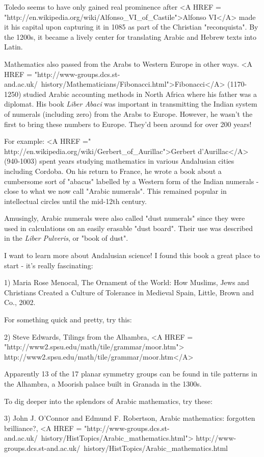 Toledo seems to have only gained real prominence after 
<A HREF = "http://en.wikipedia.org/wiki/Alfonso_VI_of_Castile">Alfonso VI</A> 
made it his capital upon capturing it in 1085 as part of the 
Christian "reconquista".  By the 1200s, it became a lively center 
for translating Arabic and Hebrew texts into Latin.   
  
Mathematics also passed from the Arabs to Western Europe in other
ways.  <A HREF = "http://www-groups.dcs.st-and.ac.uk/~history/Mathematicians/Fibonacci.html">Fibonacci</A> (1170-1250) studied Arabic accounting methods in 
North Africa where his father was a diplomat.  His book \emph{Liber Abaci}
was important in transmitting the Indian system of numerals 
(including zero) from the Arabs to Europe.  However, he wasn't the 
first to bring these numbers to Europe.  They'd been around for over 
200 years!

For example: 
<A HREF =" http://en.wikipedia.org/wiki/Gerbert_of_Aurillac">Gerbert 
d'Aurillac</A> (940-1003) spent years studying
mathematics in various Andalusian cities including Cordoba.  On
his return to France, he wrote a book about a cumbersome sort of 
"abacus" labelled by a Western form of the Indian numerals -
close to what we now call "Arabic numerals".  This 
remained popular in intellectual circles until the mid-12th century.

Amusingly, Arabic numerals were also called "dust numerals" since 
they were used in calculations on an easily erasable "dust board".
Their use was described in the \emph{Liber Pulveris}, 
or "book of dust".

I want to learn more about Andalusian science!  I found this book 
a great place to start - it's really fascinating:

1) Maria Rose Menocal, The Ornament of the World: How Muslims, Jews
and Christians Created a Culture of Tolerance in Medieval Spain,
Little, Brown and Co., 2002.

For something quick and pretty, try this:

2) Steve Edwards, Tilings from the Alhambra, 
<A HREF = "http://www2.spsu.edu/math/tile/grammar/moor.htm">
http://www2.spsu.edu/math/tile/grammar/moor.htm</A>

Apparently 13 of the 17 planar symmetry groups can be found in tile
patterns in the Alhambra, a Moorish palace built in Granada in the
1300s.

To dig deeper into the splendors of Arabic mathematics, try these:

3) John J. O'Connor and Edmund F. Robertson, Arabic mathematics: 
forgotten brilliance?, 
<A HREF = "http://www-groups.dcs.st-and.ac.uk/~history/HistTopics/Arabic_mathematics.html">
http://www-groups.dcs.st-and.ac.uk/~history/HistTopics/Arabic_mathematics.html

